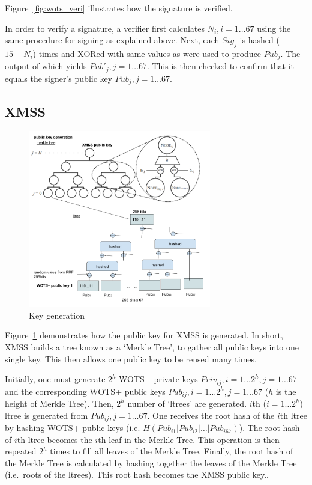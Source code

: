 \documentclass[a4paper,10pt,twocolumn]{article}
\begin{document}
 Figure~\ref{fig:wots_veri} illustrates how the signature is verified.

 In order to verify a signature, a verifier first calculates \(N_i, i=1 \ldots 67 \) using the same procedure for signing as explained 
 above. Next, each \( Sig_j \) is hashed (\(15-N_i\)) times and XORed with same values as were used to produce \( Pub_{j} \). The output 
 of which yields \( Pub'_j , j=1 \ldots 67\). This is then checked to confirm that it equals the signer's public key \( Pub_j,  j=1 
 \ldots 67 \).

\subsection{XMSS}

\begin{figure}[ht]
	\begin{center}
	\includegraphics[width=80mm]{xmss_pub.png}
	  \caption{Key generation}
    \label{fig:xmss_pub}
	\end{center}
 \end{figure}

Figure~\ref{fig:xmss_pub} demonstrates how the public key for XMSS is generated. In short, XMSS builds a tree known as a `Merkle Tree',
to gather all public keys into one single key. This then allows one public key to be reused many times.

Initially, one must generate \( 2^h \) WOTS+ private keys \( Priv_{ij}, i = 1 \ldots 2^h ,  j=1 \ldots 67\) and the
corresponding WOTS+ public keys \( Pub_{ij}, i = 1 \ldots 2^h , j=1 \ldots 67 \)  (\(h\) is the height of Merkle Tree).
Then, \(2^h\) number of `ltrees' are generated. \(i\)th (\(i = 1 \ldots 2^h\)) ltree is generated from
\( Pub_{ij}, j = 1 \ldots 67 \). One receives the root hash of the \(i\)th
ltree by hashing WOTS+ public keys (i.e. \( H(Pub_{i1} |  Pub_{i2} | \ldots  |  Pub_{i67} ) \)). The root hash of \(i\)th ltree
becomes the \(i\)th leaf in the Merkle Tree. This operation is then repeated \( 2^h \) times to fill all leaves of the Merkle Tree.
Finally, the 
root hash of the Merkle Tree is calculated by hashing together the leaves of the Merkle Tree (i.e.\ roots of the ltrees). This root 
hash becomes the XMSS public key..
\end{document}

